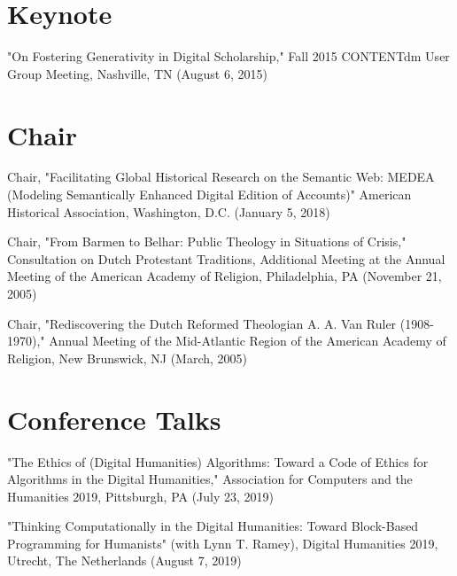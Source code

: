 \documentclass[10pt]{res} %
\begin{document}
\begin{resume}
\section{Keynote}

\begin{hangparas}{.25in}{1}"On Fostering Generativity in Digital Scholarship," Fall 2015 CONTENTdm User Group Meeting, Nashville, TN (August 6, 2015)\end{hangparas}

\section{Chair}

\begin{hangparas}{.25in}{1}Chair, "Facilitating Global Historical Research on the Semantic Web: MEDEA (Modeling Semantically Enhanced Digital Edition of Accounts)" American Historical Association, Washington, D.C. (January 5, 2018)\end{hangparas}

\begin{hangparas}{.25in}{1}Chair, "From Barmen to Belhar: Public Theology in Situations of Crisis," Consultation on Dutch Protestant Traditions, Additional Meeting at the Annual Meeting of the American Academy of Religion, Philadelphia, PA (November 21, 2005)\end{hangparas}

\begin{hangparas}{.25in}{1}Chair, "Rediscovering the Dutch Reformed Theologian A. A. Van Ruler (1908-1970)," Annual Meeting of the Mid-Atlantic Region of the American Academy of Religion, New Brunswick, NJ (March, 2005)\end{hangparas}

\section{Conference Talks}

\begin{hangparas}{.25in}{1}"The Ethics of (Digital Humanities) Algorithms: Toward a Code of Ethics for Algorithms in the Digital Humanities," Association for Computers and the Humanities 2019, Pittsburgh, PA (July 23, 2019)\end{hangparas}

\begin{hangparas}{.25in}{1}"Thinking Computationally in the Digital Humanities: Toward Block-Based Programming for Humanists" (with Lynn T. Ramey), Digital Humanities 2019, Utrecht, The Netherlands (August 7, 2019)\end{hangparas}


\end{resume}
\end{document}
